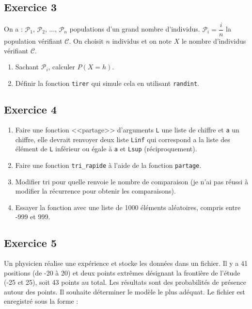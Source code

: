 \documentclass[10pt,fleqn]{article} %
\begin{document}
\begin{multicols}{2}
\subsection*{Exercice 3}
On a : $\mathcal{P}_1$, $\mathcal{P}_2$, ..., $\mathcal{P}_n$ populations d'un grand nombre d'individus. $\mathcal{P}_i  =\dfrac{i}{n}$ la population vérifiant $\mathcal{C}$. On choisit $n$ individus et on note $X$ le nombre d'individus vérifiant $\mathcal{C}$.
\begin{enumerate}
\item Sachant $\mathcal{P}_i$, calculer $P\left(X=h\right)$.
\item Définir la fonction \texttt{tirer} qui simule cela en utilisant \texttt{randint}. 
\end{enumerate}


\subsection*{Exercice 4}

\begin{enumerate}
\item Faire une fonction <<partage>> d'arguments \texttt{L} une liste de chiffre et \texttt{a} un chiffre, elle devrait renvoyer deux liste \texttt{Linf} qui correspond a la liste des élément de \texttt{L} inférieur ou égale à \texttt{a} et \texttt{Lsup} (réciproquement).
\item Faire une fonction \texttt{tri\_rapide} à l'aide de la fonction \texttt{partage}.
\item Modifier tri pour quelle renvoie le nombre de comparaison (je n'ai pas réussi à modifier la récurrence pour obtenir les comparaisons).
\item Essayer la fonction avec une liste de 1000 éléments aléatoires, compris entre -999 et 999.
\end{enumerate}


\subsection*{Exercice 5}

Un physicien réalise une expérience et stocke les données dans un fichier. Il y a 41 positions (de -20 à 20) et deux points extrêmes désignant la frontière de l’étude (-25 et 25), soit 43 points au total. Les résultats sont des probabilités de présence autour des points. Il souhaite déterminer le modèle le plus adéquat.
Le fichier est enregistré sous la forme :  


\end{multicols}
\end{document}
